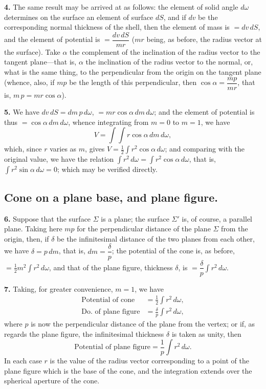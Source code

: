 \documentclass[11pt,a4paper]{book}
\begin{document}
\smallskip\noindent\textbf{4.}\quad
The same result may be arrived at as follows: the element of solid angle
$d\omega$ determines on the surface an element of surface $dS$, and if $dv$
be the corresponding normal thickness of the shell, then the element of mass
is $=dv\,dS$, and the element of potential is $=\dfrac{dv\,dS}{mr}$ ($mr$
being, as before, the radius vector at the surface). Take $\alpha$ the
complement of the inclination of the radius vector to the tangent plane---that
is, $\alpha$ the inclination of the radius vector to the normal, or, what is
the same thing, to the perpendicular from the origin on the tangent plane
(whence, also, if $mp$ be the length of this perpendicular, then
$\cos\alpha = \dfrac{mp}{mr}$, that is, $m\,p = mr\cos\alpha$).

\newpage
\noindent\textbf{5.}\quad
We have $dv\,dS = dm\,p\,d\omega$, $= mr\cos\alpha\,dm\,d\omega$; and the
element of potential is thus $=\cos\alpha\,dm\,d\omega$, whence integrating
from $m=0$ to $m=1$, we have
\[
V = \int\!\!\int r\cos\alpha\,dm\,d\omega,
\]
which, since $r$ varies as $m$, gives $V = \tfrac{1}{2}\int r^2\cos\alpha\,d\omega$;
and comparing with the original value, we have the relation
$\int r^2\,d\omega = \int r^2\cos\alpha\,d\omega$, that is,
$\int r^2\sin\alpha\,d\omega = 0$; which may be verified directly.

\subsection*{Cone on a plane base, and plane figure.}

\smallskip\noindent\textbf{6.}\quad
Suppose that the surface $\Sigma$ is a plane; the surface $\Sigma'$ is, of
course, a parallel plane. Taking here $mp$ for the perpendicular distance of
the plane $\Sigma$ from the origin, then, if $\delta$ be the infinitesimal
distance of the two planes from each other, we have $\delta = p\,dm$, that
is, $dm = \dfrac{\delta}{p}$; the potential of the cone is, as before,
$= \tfrac{1}{2}m^2 \int r^2\,d\omega$, and that of the plane figure, thickness
$\delta$, is $= \dfrac{\delta}{p} \int r^2\,d\omega$.

\smallskip\noindent\textbf{7.}\quad
Taking, for greater convenience, $m=1$, we have
\begin{align*}
\text{Potential of cone} &= \tfrac{1}{2}\int r^2\,d\omega,\\
\text{Do.\ of plane figure} &= \frac{\delta}{p}\int r^2\,d\omega,
\end{align*}
where $p$ is now the perpendicular distance of the plane from the vertex; or
if, as regards the plane figure, the infinitesimal thickness $\delta$ is
taken as unity, then
\[
\text{Potential of plane figure} = \frac{1}{p}\int r^2\,d\omega.
\]
In each case $r$ is the value of the radius vector corresponding to a point
of the plane figure which is the base of the cone, and the integration
extends over the spherical aperture of the cone.
\end{document}
